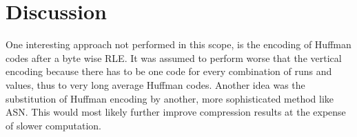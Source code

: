 
\chapter{Discussion}
\label{ch:Discussion}

\par{
	One interesting approach not performed in this scope, is the encoding of Huffman codes after a byte wise RLE. It was assumed to perform worse that the vertical encoding because there has to be one code for every combination of runs and values, thus to very long average Huffman codes. Another idea was the substitution of Huffman encoding by another, more sophisticated method like ASN. This would most likely further improve compression results at the expense of slower computation.
}

